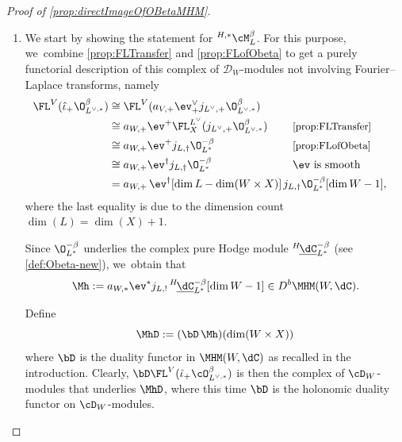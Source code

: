 \skpt
\begin{proof}[Proof of \cref{prop:directImageOfOBetaMHM}]
\begin{enumerate}
\item
We start by showing the statement for ${^{H,*}}\cM_L^\beta$. For this purpose, we~combine \cref{prop:FLTransfer} and \cref{prop:FLofObeta} to get a purely functorial description of this complex of $\mathscr{D}_W$\nobreakdash-mod\-ules not involving Fourier--Laplace transforms, namely
\begin{equation}\label{eq:ProofOf38}
\begin{aligned}
\FL^V(\hat\iota_+ \O_{L^{\vee,*}}^{\beta}) 
&\cong \FL^V(a_{V,+}\ev^\vee_+ j_{{L^{\vee}},+} \O_{L^{\vee,*}}^\beta) \\
&\cong a_{W,+} \ev^+ \FL_X^{L^\vee}(j_{{L^\vee},+} \O_{L^{\vee,*}}^\beta) && {\textup{\small\cref{prop:FLTransfer}}} \\
&\cong a_{W,+} \ev^+ j_{L,\dag} \O_{L^{*}}^{-\beta} &&{\textup{\small\cref{prop:FLofObeta}}}\\
&\cong a_{W,+} \ev^\dag j_{L,\dag} \O_{L^{*}}^{-\beta} &&{\ev \textup{ is smooth}}\\
&= a_{W,+} \, \ev^\dag[\dim L - \dim (W\times X)] &&\hspace*{-3mm} j_{L,\dag} \O_{L^{*}}^{-\beta}[\dim W-1],
\end{aligned}
\end{equation}
where the last equality is due to the dimension count $\dim(L)=\dim(X)+1$.

Since $\O_{L^*}^{-\beta}$ underlies the complex pure Hodge module $^{H\!}\underline{\dC}^{-\beta}_{L^*}$ (see \cref{def:Obeta-new}), we~obtain that
\begin{equation}\label{eq:defMbeta}
\Mh := a_{W,*} \ev^* j_{L,!}\, ^{H\!}\underline{\dC}^{-\beta}_{L^*}[\dim W-1]
\in D^b\MHM(W,\dC).
\end{equation}

Define
\[
\MhD:=(\bD\, \Mh)(\dim(W \times X))
\]
where $\bD$ is the duality functor in $\MHM(W,\dC)$ as recalled in the introduction. Clearly, $\bD \FL^V(\hat{\iota}_+\cO^\beta_{L^{\vee,*}})$ is then the complex of $\cD_W$\nobreakdash-mod\-ules that underlies $\MhD$, where this time $\bD$ is the holonomic duality functor on $\cD_W$\nobreakdash-mod\-ules.


\end{enumerate}
\end{proof}
